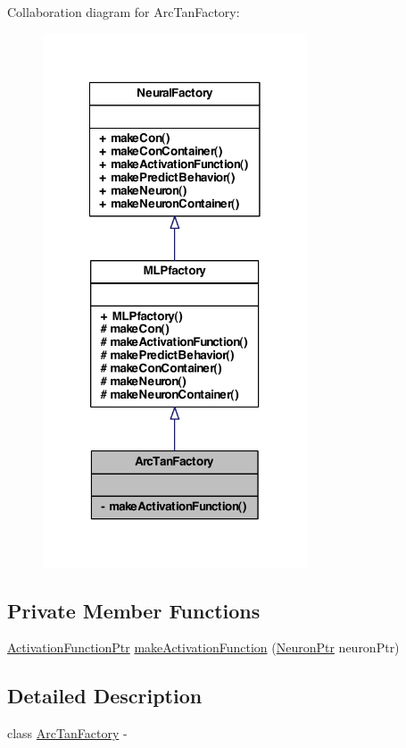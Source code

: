Collaboration diagram for ArcTanFactory:
\nopagebreak
\begin{figure}[H]
\begin{center}
\leavevmode
\includegraphics[width=222pt]{class_arc_tan_factory__coll__graph}
\end{center}
\end{figure}
\subsection*{Private Member Functions}
\begin{DoxyCompactItemize}
\item 
\hyperlink{_a_m_o_r_e_8h_a77602a0277a02e5769c3df0adc669b17}{ActivationFunctionPtr} \hyperlink{class_arc_tan_factory_ae07c1b383c55ee42732d97fb2215d7fb}{makeActivationFunction} (\hyperlink{_a_m_o_r_e_8h_ac1ea936c2c7728eb382278131652fef4}{NeuronPtr} neuronPtr)
\end{DoxyCompactItemize}


\subsection{Detailed Description}
class \hyperlink{class_arc_tan_factory}{ArcTanFactory} -\/ 

